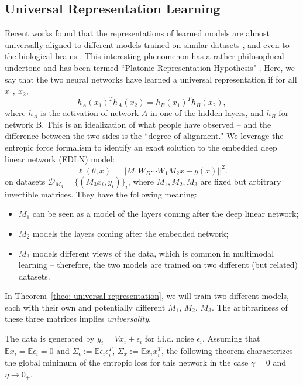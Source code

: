 \documentclass{article}
\theoremstyle{plain}
\newcommand{\E}{\mathbb{E}}
\begin{document}
\subsection{Universal Representation Learning}
\vspace{-1mm}
Recent works found that the representations of learned models are almost universally aligned to different models trained on similar datasets \cite{bansal2021revisiting, kornblith2019similarity}, and even to the biological brains \cite{yamins2014performance}. This interesting phenomenon has a rather philosophical undertone and has been termed ``Platonic Representation Hypothesis" \cite{huh2024platonic}. Here, we say that the two neural networks have learned a universal representation if for all $x_1,\ x_2$, 
\begin{equation}\label{eq: universal alignment}
    h_A(x_1)^T h_A(x_2) = h_B(x_1)^T h_B(x_2),
\end{equation}
where $h_A$ is the activation of network $A$ in one of the hidden layers, and  $h_B$ for network B. This is an idealization of what people have observed -- and the difference between the two sides is the ``degree of alignment." We leverage the entropic force formalism to identify an exact solution to the embedded deep linear network (EDLN) model: 
\begin{equation}
\ell(\theta, x)=||M_1W_D\cdots W_1M_2 x-y(x)||^2.
\label{eq:loss_deep_linear}
\end{equation}
on datasets $\mathcal{D}_{M_3} = \{(M_3x_i, y_i)\}_i$, where $M_1,M_2,M_3$ are fixed but arbitrary invertible matrices. They have the following meaning:
\begin{itemize}[noitemsep,topsep=0pt, parsep=0pt,partopsep=0pt, leftmargin=15pt]
    \item $M_1$ can be seen as a model of the layers coming after the deep linear network;
    \item $M_2$ models the layers coming after the embedded network;
    \item $M_3$ models different views of the data, which is common in multimodal learning -- therefore, the two models are trained on two different (but related) datasets.
\end{itemize}
In Theorem~\ref{theo: universal representation}, we will train two different models, each with their own and potentially different $M_1$, $M_2$, $M_3$. The arbitrariness of these three matrices implies \textit{universality}.

The data is generated by $y_i=Vx_i+\epsilon_i$ for i.i.d. noise $\epsilon_i$. Assuming that $\E x_i=\E\epsilon_i=0$ and $\Sigma_\epsilon:=\E\epsilon_i\epsilon_i^T$, $\Sigma_x:=\E x_ix_i^T$, %
the following theorem characterizes the global minimum of the entropic loss for this network in the case $\gamma=0$ and $\eta \to 0_+$.
\end{document}
